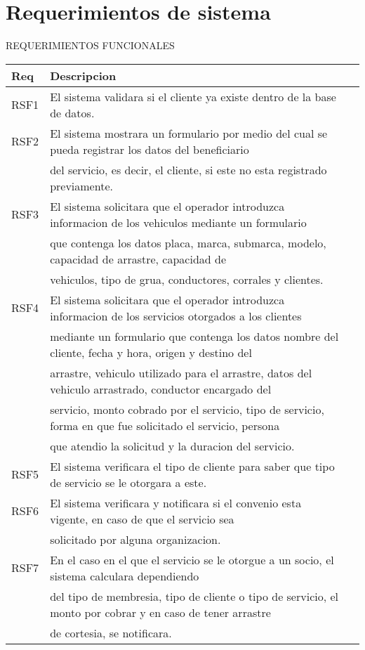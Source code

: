 \section{Requerimientos de sistema}
\begin{description}

\item REQUERIMIENTOS FUNCIONALES

\begin{tabular}{||l | l | r||} \hline \hline Req & Descripcion  \\ \hline
RSF1 & El sistema validara si el cliente ya existe dentro de la base de datos. \\ \hline 
RSF2 & El sistema mostrara un formulario por medio del cual se pueda registrar los datos del beneficiario \\ & del servicio, es decir, el cliente, si este no esta registrado previamente. \\ \hline 
RSF3 & El sistema solicitara que el operador introduzca informacion de los vehiculos mediante un formulario \\ & que contenga los datos placa, marca, submarca, modelo, capacidad de arrastre, capacidad de \\ & vehiculos, tipo de grua, conductores, corrales y clientes.\\ \hline 
RSF4 & El sistema solicitara que el operador introduzca informacion de los servicios otorgados a los clientes \\ & mediante un formulario que contenga los datos nombre del cliente, fecha y hora, origen y destino del \\ & arrastre, vehiculo utilizado para el arrastre, datos del vehiculo arrastrado, conductor encargado del \\ &servicio, monto  cobrado por el servicio, tipo de servicio, forma en que fue solicitado el servicio, persona\\ & que atendio la solicitud y  la duracion del servicio.
 \\ \hline 
RSF5 & El sistema verificara el tipo de cliente para saber que tipo de servicio se le otorgara a este. \\ \hline 
RSF6 & El sistema verificara y notificara si el convenio esta vigente, en caso de que el servicio sea \\ & solicitado por alguna organizacion. \\ \hline 
RSF7 & En el caso en el que el servicio se le otorgue a un socio, el sistema calculara dependiendo \\ & del tipo de membresia, tipo de cliente o tipo de servicio, el monto por cobrar y en caso de tener arrastre\\ & de cortesia, se notificara. \\ \hline 

\end{tabular}
\end{description}
